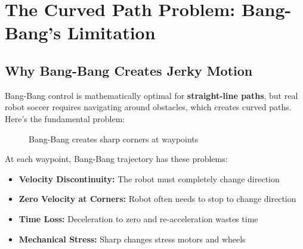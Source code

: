 \documentclass[12pt,a4paper]{article}
\begin{document}
\section{The Curved Path Problem: Bang-Bang's Limitation}

\subsection{Why Bang-Bang Creates Jerky Motion}

Bang-Bang control is mathematically optimal for \textbf{straight-line paths}, but real robot soccer requires navigating around obstacles, which creates curved paths. Here's the fundamental problem:

\begin{figure}[H]
\centering
{}
\caption{Bang-Bang creates sharp corners at waypoints}
\end{figure}

At each waypoint, Bang-Bang trajectory has these problems:
\begin{itemize}
    \item \textbf{Velocity Discontinuity:} The robot must completely change direction
    \item \textbf{Zero Velocity at Corners:} Robot often needs to stop to change direction
    \item \textbf{Time Loss:} Deceleration to zero and re-acceleration wastes time
    \item \textbf{Mechanical Stress:} Sharp changes stress motors and wheels
\end{itemize}
\end{document}
